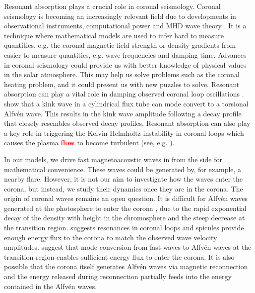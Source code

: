 \documentclass[linenumbers]{aastex63}
\newcommand{\alexedit}[1]{\textcolor{red}{\textbf{#1}}}
\begin{document}
Resonant absorption plays a crucial role in coronal seismology. Coronal seismology is becoming an increasingly relevant field due to developments in observational instruments, computational power and MHD wave theory \citep{DeMoortel2012}. It is a technique where mathematical models are used to infer hard to measure quantities, e.g. the coronal magnetic field strength or density gradients from easier to measure quantities, e.g. wave frequencies and damping time. Advances in coronal seismology could provide us with better knowledge of physical values in the solar atmosphere. This may help us solve problems such as the coronal heating problem, and it could present us with new puzzles to solve. Resonant absorption can play a vital role in damping observed coronal loop oscillations \citep{Nakariakov1999,Terradas2006}. \citet{Ruderman2002} show that a kink wave in a cylindrical flux tube can mode convert to a torsional Alfv\'en wave. This results in the kink wave amplitude following a decay profile that closely resembles observed decay profiles. Resonant absorption can also play a key role in triggering the Kelvin-Helmholtz instability in coronal loops which causes the plasma \alexedit{flow} to become turbulent (see, e.g. \citealt{Antolin2016,Howson2017}).

In our models, we drive fast magnetoacoustic waves in from the side for mathematical convenience. These waves could be generated by, for example, a nearby flare. However, it is not our aim to investigate how the waves enter the corona, but instead, we study their dynamics
once they are in the corona. The origin of coronal waves remains an open question. It is difficult for Alfv\'en waves generated at the photosphere to enter the corona \citep{Cranmer2005}, due to the rapid exponential decay of the density with height in the chromosphere and the steep decrease at the transition region. \citet{Hollweg1984} suggests resonances in coronal loops and spicules provide enough energy flux to the corona to match the observed wave velocity amplitudes. \citet{Cally2011,Hansen2012} suggest that mode conversion from fast waves to Alfv\'en waves at the transition region enables sufficient energy flux to enter the corona. It is also possible that the corona itself generates Alfv\'en waves via magnetic reconnection \citep{Cranmer2018} and the energy released during reconnection partially feeds into the energy contained in the Alfv\'en waves.
\end{document}

